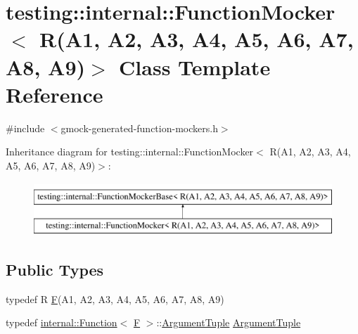 \hypertarget{classtesting_1_1internal_1_1FunctionMocker_3_01R_07A1_00_01A2_00_01A3_00_01A4_00_01A5_00_01A6_00_01A7_00_01A8_00_01A9_08_4}{}\section{testing\+::internal\+::Function\+Mocker$<$ R(A1, A2, A3, A4, A5, A6, A7, A8, A9)$>$ Class Template Reference}
\label{classtesting_1_1internal_1_1FunctionMocker_3_01R_07A1_00_01A2_00_01A3_00_01A4_00_01A5_00_01A6_00_01A7_00_01A8_00_01A9_08_4}


{\ttfamily \#include $<$gmock-\/generated-\/function-\/mockers.\+h$>$}

Inheritance diagram for testing\+::internal\+::Function\+Mocker$<$ R(A1, A2, A3, A4, A5, A6, A7, A8, A9)$>$\+:\begin{figure}[H]
\begin{center}
\leavevmode
\includegraphics[height=2.000000cm]{classtesting_1_1internal_1_1FunctionMocker_3_01R_07A1_00_01A2_00_01A3_00_01A4_00_01A5_00_01A6_00_01A7_00_01A8_00_01A9_08_4}
\end{center}
\end{figure}
\subsection*{Public Types}
\begin{DoxyCompactItemize}
\item 
typedef R \mbox{\hyperlink{classtesting_1_1internal_1_1FunctionMocker_3_01R_07A1_00_01A2_00_01A3_00_01A4_00_01A5_00_01A6_00_01A7_00_01A8_00_01A9_08_4_a8de64ec5559bd4e4410a4374e9c93e4e}{F}}(A1, A2, A3, A4, A5, A6, A7, A8, A9)
\item 
typedef \mbox{\hyperlink{structtesting_1_1internal_1_1Function}{internal\+::\+Function}}$<$ \mbox{\hyperlink{classtesting_1_1internal_1_1FunctionMocker_3_01R_07A1_00_01A2_00_01A3_00_01A4_00_01A5_00_01A6_00_01A7_00_01A8_00_01A9_08_4_a8de64ec5559bd4e4410a4374e9c93e4e}{F}} $>$\+::\mbox{\hyperlink{classtesting_1_1internal_1_1FunctionMocker_3_01R_07A1_00_01A2_00_01A3_00_01A4_00_01A5_00_01A6_00_01A7_00_01A8_00_01A9_08_4_afcb802dfc6e26a318bd0599846bff218}{Argument\+Tuple}} \mbox{\hyperlink{classtesting_1_1internal_1_1FunctionMocker_3_01R_07A1_00_01A2_00_01A3_00_01A4_00_01A5_00_01A6_00_01A7_00_01A8_00_01A9_08_4_afcb802dfc6e26a318bd0599846bff218}{Argument\+Tuple}}
\end{DoxyCompactItemize}
